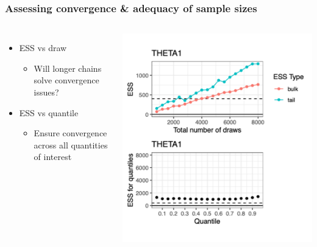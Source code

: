 \documentclass{beamer}
\begin{document}
\begin{frame}
  \frametitle{Assessing convergence \& adequacy of sample sizes}

\begin{columns}
  \begin{itemize}
    \item ESS vs draw
          \begin{itemize}
            \item Will longer chains solve convergence issues?
          \end{itemize}
    \item ESS vs quantile
          \begin{itemize}
            \item Ensure convergence across all quantities of interest
          \end{itemize}
  \end{itemize}
  \center
  \vspace{-16pt}
  \includegraphics[width=\textwidth]{graphics/ess-vs-draw-quantile.pdf}
\end{columns}

\end{frame}
\end{document}
